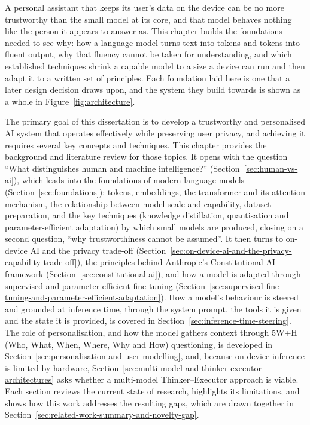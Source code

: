 A personal assistant that keeps its user's data on the device can be no more trustworthy than the small model at its core, and that model behaves nothing like the person it appears to answer as. This chapter builds the foundations needed to see why: how a language model turns text into tokens and tokens into fluent output, why that fluency cannot be taken for understanding, and which established techniques shrink a capable model to a size a device can run and then adapt it to a written set of principles. Each foundation laid here is one that a later design decision draws upon, and the system they build towards is shown as a whole in Figure~\ref{fig:architecture}.

The primary goal of this dissertation is to develop a trustworthy and personalised AI system that operates effectively while preserving user privacy, and achieving it requires several key concepts and techniques. This chapter provides the background and literature review for those topics. It opens with the question ``What distinguishes human and machine intelligence?'' (Section~\ref{sec:human-vs-ai}), which leads into the foundations of modern language models (Section~\ref{sec:foundations}): tokens, embeddings, the transformer and its attention mechanism, the relationship between model scale and capability, dataset preparation, and the key techniques (knowledge distillation, quantisation and parameter-efficient adaptation) by which small models are produced, closing on a second question, ``why trustworthiness cannot be assumed''. It then turns to on-device AI and the privacy trade-off (Section~\ref{sec:on-device-ai-and-the-privacy-capability-trade-off}), the principles behind Anthropic's Constitutional AI framework (Section~\ref{sec:constitutional-ai}), and how a model is adapted through supervised and parameter-efficient fine-tuning (Section~\ref{sec:supervised-fine-tuning-and-parameter-efficient-adaptation}). How a model's behaviour is steered and grounded at inference time, through the system prompt, the tools it is given and the state it is provided, is covered in Section~\ref{sec:inference-time-steering}. The role of personalisation, and how the model gathers context through 5W+H (Who, What, When, Where, Why and How) questioning, is developed in Section~\ref{sec:personalisation-and-user-modelling}, and, because on-device inference is limited by hardware, Section~\ref{sec:multi-model-and-thinker-executor-architectures} asks whether a multi-model Thinker--Executor approach is viable. Each section reviews the current state of research, highlights its limitations, and shows how this work addresses the resulting gaps, which are drawn together in Section~\ref{sec:related-work-summary-and-novelty-gap}.

